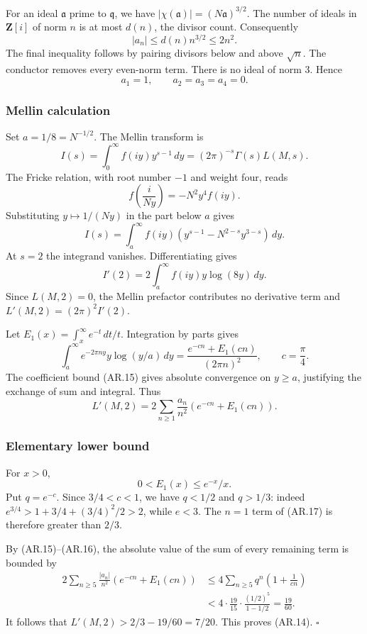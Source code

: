 For an ideal \(\mathfrak a\) prime to \(\mathfrak q\), we have
\(|\chi(\mathfrak a)|=(N\mathfrak a)^{3/2}\). The number of ideals in
\(\mathbf Z[i]\) of norm \(n\) is at most \(d(n)\), the divisor count.
Consequently \[
|a_n|\le d(n)n^{3/2}\le2n^2.
\tag{AR.15}
\] The final inequality follows by pairing divisors below and above
\(\sqrt n\). The conductor removes every even-norm term. There is no
ideal of norm \(3\). Hence \[
a_1=1,\qquad a_2=a_3=a_4=0.
\tag{AR.16}
\]

\subsubsection{Mellin calculation}\label{mellin-calculation}

Set \(a=1/8=N^{-1/2}\). The Mellin transform is \[
I(s)=\int_0^\infty f(iy)y^{s-1}\,dy
     =(2\pi)^{-s}\Gamma(s)L(M,s).
\] The Fricke relation, with root number \(-1\) and weight four, reads
\[
f\!\left(\frac{i}{Ny}\right)=-N^2y^4 f(iy).
\] Substituting \(y\mapsto1/(Ny)\) in the part below \(a\) gives \[
I(s)=\int_a^\infty f(iy)
 \left(y^{s-1}-N^{2-s}y^{3-s}\right)\,dy.
\] At \(s=2\) the integrand vanishes. Differentiating gives \[
I'(2)=2\int_a^\infty f(iy)y\log(8y)\,dy.
\] Since \(L(M,2)=0\), the Mellin prefactor contributes no derivative
term and \(L'(M,2)=(2\pi)^2I'(2)\).

Let \(E_1(x)=\int_x^\infty e^{-t}\,dt/t\). Integration by parts gives \[
\int_a^\infty e^{-2\pi ny}y\log(y/a)\,dy
 =\frac{e^{-cn}+E_1(cn)}{(2\pi n)^2},
\qquad c=\frac\pi4.
\] The coefficient bound (AR.15) gives absolute convergence on
\(y\ge a\), justifying the exchange of sum and integral. Thus \[
L'(M,2)
 =2\sum_{n\ge1}\frac{a_n}{n^2}
       \left(e^{-cn}+E_1(cn)\right).
\tag{AR.17}
\]

\subsubsection{Elementary lower bound}\label{elementary-lower-bound}

For \(x>0\), \[
0<E_1(x)\le e^{-x}/x.
\] Put \(q=e^{-c}\). Since \(3/4<c<1\), we have \(q<1/2\) and \(q>1/3\):
indeed \(e^{3/4}>1+3/4+(3/4)^2/2>2\), while \(e<3\). The \(n=1\) term of
(AR.17) is therefore greater than \(2/3\).

By (AR.15)--(AR.16), the absolute value of the sum of every remaining
term is bounded by \[
\begin{aligned}
2\sum_{n\ge5}\frac{|a_n|}{n^2}
       \left(e^{-cn}+E_1(cn)\right)
&\le4\sum_{n\ge5}q^n\left(1+\frac1{cn}\right)\\
&<4\cdot\frac{19}{15}\cdot
       \frac{(1/2)^5}{1-1/2}
 =\frac{19}{60}.
\end{aligned}
\] It follows that \(L'(M,2)>2/3-19/60=7/20\). This proves (AR.14).
\(\square\)

